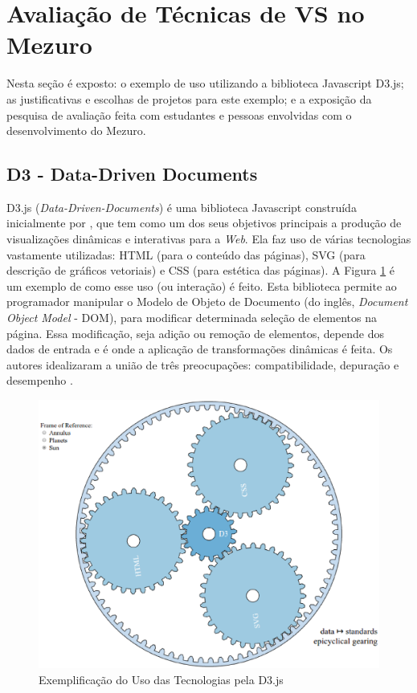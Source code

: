 
\section{Avaliação de Técnicas de VS no Mezuro}

Nesta seção é exposto: o exemplo de uso utilizando a biblioteca Javascript D3.js;
as justificativas e escolhas de projetos para este exemplo; e a exposição da
pesquisa de avaliação feita com estudantes e pessoas envolvidas com o
desenvolvimento do Mezuro.

\subsection{D3 - Data-Driven Documents}

D3.js (\textit{Data-Driven-Documents}) é uma biblioteca Javascript construída
inicialmente por , que tem como um dos seus objetivos
principais a produção de visualizações dinâmicas e interativas para a \textit{Web}. Ela
faz uso de várias tecnologias vastamente utilizadas: HTML (para o conteúdo das
páginas), SVG (para descrição de gráficos vetoriais) e CSS (para estética das
páginas). A Figura \ref{fig:d3_gears} é um exemplo de como esse uso (ou
interação) é feito. Esta biblioteca permite ao programador manipular o Modelo de
Objeto de Documento (do inglês, \textit{Document Object Model} - DOM), para
modificar determinada seleção de elementos na página. Essa modificação, seja
adição ou remoção de elementos, depende dos dados de entrada e é onde a
aplicação de transformações dinâmicas é feita. Os autores idealizaram a união de
três preocupações: compatibilidade, depuração e desempenho \cite{bostock2011d3}.

\begin{figure}[!htb]
	\centering
    \includegraphics[keepaspectratio=true,scale=0.5]
    {figuras/d3_gears.eps}
  \caption{Exemplificação do Uso das Tecnologias pela D3.js \cite{michaeld3}}
  \label{fig:d3_gears}
\end{figure}

